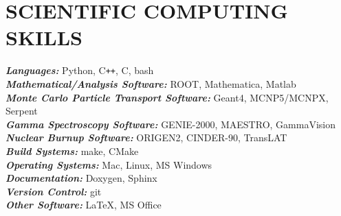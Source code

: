 \section{\small{SCIENTIFIC COMPUTING \\ SKILLS}}

{\sl\bf Languages:} \hfill Python, C\verb!++!, C, bash\\
{\sl\bf Mathematical/Analysis Software:} \hfill ROOT, Mathematica, Matlab\\ %
{\sl\bf Monte Carlo Particle Transport Software:} \hfill Geant4, MCNP5/MCNPX, Serpent\\
{\sl\bf Gamma Spectroscopy Software:} \hfill GENIE-2000, MAESTRO, GammaVision\\
{\sl\bf Nuclear Burnup Software:} \hfill ORIGEN2, CINDER-90, TransLAT\\
{\sl\bf Build Systems:} \hfill make, CMake\\
{\sl\bf Operating Systems:} \hfill Mac, Linux, MS Windows\\
{\sl\bf Documentation:} \hfill Doxygen, Sphinx\\
{\sl\bf Version Control:} \hfill git\\
{\sl\bf Other Software:} \hfill \LaTeX, MS Office

%